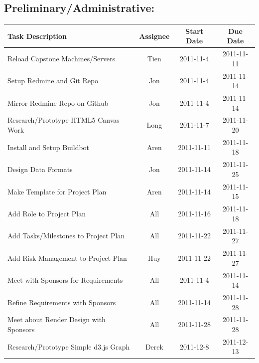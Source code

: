 \documentclass[12pt, letterpaper]{article}
\begin{document}
	\subsection{Preliminary/Administrative:}

  \begin{center}
    \begin{tabular}{| p{8.3cm} || c | c | c | }
      \hline
      Task Description & Assignee & Start Date & Due Date \\
      \hline
			Reload Capstone Machines/Servers & Tien & 2011-11-4 & 2011-11-11\\
			Setup Redmine and Git Repo & Jon & 2011-11-4 & 2011-11-14 \\
			Mirror Redmine Repo on Github & Jon & 2011-11-4 & 2011-11-14 \\
			Research/Prototype HTML5 Canvas Work & Long & 2011-11-7 & 2011-11-20 \\
      Install and Setup Buildbot & Aren & 2011-11-11 & 2011-11-18 \\
            Design Data Formats & Jon & 2011-11-14 & 2011-11-25 \\
      Make Template for Project Plan & Aren & 2011-11-14 & 2011-11-15 \\
			Add Role to Project Plan & All & 2011-11-16 & 2011-11-18 \\
			Add Tasks/Milestones to Project Plan & All & 2011-11-22 & 2011-11-27\\
			Add Risk Management to Project Plan & Huy & 2011-11-22 & 2011-11-27\\
			Meet with Sponsors for Requirements & All & 2011-11-4 & 2011-11-14\\
			Refine Requirements with Sponsors & All & 2011-11-14 & 2011-11-28\\
			Meet about Render Design with Sponsors & All & 2011-11-28 & 2011-11-28 \\
            Research/Prototype Simple d3.js Graph & Derek & 2011-12-8 & 2011-12-13 \\
      \hline
    \end{tabular}
  \end{center}
\end{document}
